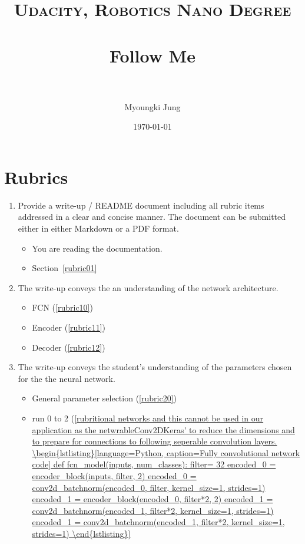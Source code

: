 \documentclass[paper=a4, fontsize=11pt]{scrartcl} %
\title{	
\normalfont \normalsize 
\textsc{Udacity, Robotics Nano Degree} \\ [25pt] %
\horrule{0.5pt} \\[0.4cm] %
\huge Follow Me \\ %
\horrule{2pt} \\[0.5cm] %
}
\author{Myoungki Jung} %
\date{\normalsize\today} %
\numberwithin{equation}{section} %
\numberwithin{figure}{section} %
\numberwithin{table}{section} %
\begin{document}
\maketitle %
\section{Rubrics}

\begin{enumerate}
	\item Provide a write-up / README document including all rubric items addressed in a clear and concise manner. The document can be submitted either in either Markdown or a PDF format.
	\begin{itemize} %
	  \item You are reading the documentation.
	  \item Section~\ref{rubric01}
	\end{itemize}
	\item The write-up conveys the an understanding of the network architecture. 
	\begin{itemize} %
		\item FCN (\ref{rubric10})
		\item Encoder (\ref{rubric11})
		\item Decoder (\ref{rubric12})

	\end{itemize}
	\item The write-up conveys the student's understanding of the parameters chosen for the the neural network.  
	\begin{itemize} %
		\item General parameter selection (\ref{rubric20})
		\item run 0 to 2 (\ref{rubritional networks and this cannot be used in our application as the netwrableConv2DKeras' to reduce the dimensions and to prepare for connections to following seperable convolution layers.

\begin{lstlisting}[language=Python, caption=Fully convolutional network code]
	def fcn_model(inputs, num_classes):

		filter= 32
		
		encoded_0 = encoder_block(inputs, filter, 2)
		encoded_0 = conv2d_batchnorm(encoded_0, filter, kernel_size=1, strides=1)

		encoded_1 = encoder_block(encoded_0, filter*2, 2)
		encoded_1 = conv2d_batchnorm(encoded_1, filter*2, kernel_size=1, strides=1)
		encoded_1 = conv2d_batchnorm(encoded_1, filter*2, kernel_size=1, strides=1)


\end{lstlisting}}
\end{itemize}
\end{enumerate}
\end{document}
